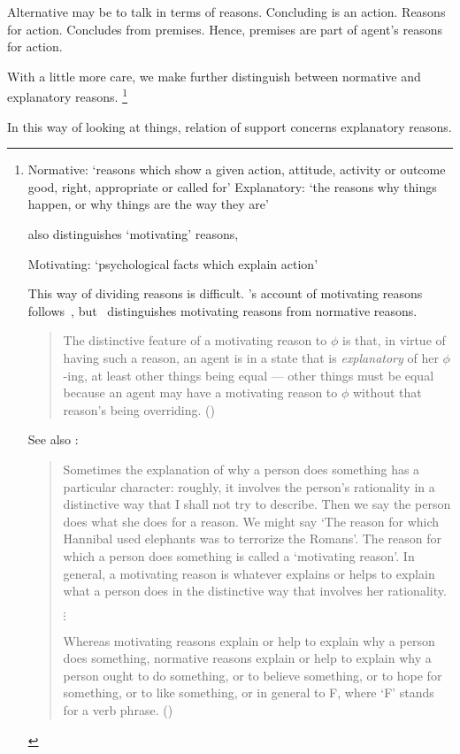 \begin{note}
  Alternative may be to talk in terms of reasons.
  Concluding is an action.
  Reasons for action.
  Concludes from premises.
  Hence, premises are part of agent's reasons for action.

  With a little more care, we make further distinguish between normative and explanatory reasons.%
  \footnote{
    Normative: `reasons which show a given action, attitude, activity or outcome good, right, appropriate or called for'
    Explanatory: `the reasons why things happen, or why things are the way they are'
    \citeyear[410]{Hieronymi:2011aa}

    \citeauthor{Hieronymi:2011aa} also distinguishes `motivating' reasons,

    Motivating: `psychological facts which explain action'
    \citeyear[411--412]{Hieronymi:2011aa}

    This way of dividing reasons is difficult.
    \citeauthor{Hieronymi:2011aa}'s account of motivating reasons follows~\textcite{Smith:1994wo}, but~\citeauthor{Smith:1994wo} distinguishes motivating reasons from normative reasons.

    \begin{quote}
      The distinctive feature of a motivating reason to \(\phi\) is that, in virtue of having such a reason, an agent is in a state that is \emph{explanatory} of her \(\phi\)-ing, at least other things being equal --- other things must be equal because an agent may have a motivating reason to \(\phi\) without that reason's being overriding.%
      \mbox{}\hfill\mbox{(\citeyear{Smith:1994wo})}
    \end{quote}

    See also \citeauthor{Broome:2013aa}:
    \begin{quote}
      Sometimes the explanation of why a person does something has a particular character:
      roughly, it involves the person's rationality in a distinctive way that I shall not try to describe.
      Then we say the person does what she does for a reason.
      We might say ‘The reason for which Hannibal used elephants was to terrorize the Romans'.
      The reason for which a person does something is called a ‘motivating reason'.
      In general, a motivating reason is whatever explains or helps to explain what a person does in the distinctive way that involves her rationality.

      \mbox{}\hfill\(\vdots\)\hfill\mbox{}

      Whereas motivating reasons explain or help to explain why a person does something, normative reasons explain or help to explain why a person ought to do something, or to believe something, or to hope for something, or to like something, or in general to F, where ‘F' stands for a verb phrase.%
      \mbox{}\hfill\mbox{(\citeyear[46--47]{Broome:2013aa})}
    \end{quote}
  }

  In this way of looking at things, relation of support concerns explanatory reasons.
\end{note}

